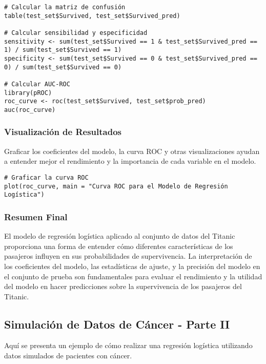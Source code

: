 \begin{verbatim}
# Calcular la matriz de confusión
table(test_set$Survived, test_set$Survived_pred)

# Calcular sensibilidad y especificidad
sensitivity <- sum(test_set$Survived == 1 & test_set$Survived_pred == 1) / sum(test_set$Survived == 1)
specificity <- sum(test_set$Survived == 0 & test_set$Survived_pred == 0) / sum(test_set$Survived == 0)

# Calcular AUC-ROC
library(pROC)
roc_curve <- roc(test_set$Survived, test_set$prob_pred)
auc(roc_curve)
\end{verbatim}

\subsubsection*{Visualización de Resultados}

Graficar los coeficientes del modelo, la curva ROC y otras visualizaciones ayudan a entender mejor el rendimiento y la importancia de cada variable en el modelo.

\begin{verbatim}
# Graficar la curva ROC
plot(roc_curve, main = "Curva ROC para el Modelo de Regresión Logística")
\end{verbatim}

\subsubsection*{Resumen Final}

El modelo de regresión logística aplicado al conjunto de datos del Titanic proporciona una forma de entender cómo diferentes características de los pasajeros influyen en sus probabilidades de supervivencia. La interpretación de los coeficientes del modelo, las estadísticas de ajuste, y la precisión del modelo en el conjunto de prueba son fundamentales para evaluar el rendimiento y la utilidad del modelo en hacer predicciones sobre la supervivencia de los pasajeros del Titanic.

\subsection{Simulaci\'on de Datos de Cáncer - Parte II}

Aquí se presenta un ejemplo de cómo realizar una regresión logística utilizando datos simulados de pacientes con cáncer.

